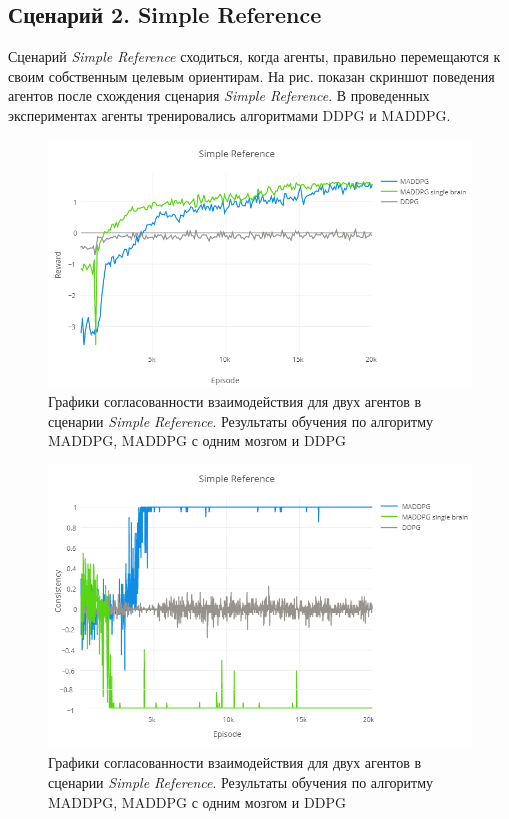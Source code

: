 \subsection{Сценарий 2. Simple Reference}

Сценарий \textit{Simple Reference} сходиться, когда агенты, правильно перемещаются к своим собственным целевым ориентирам. На рис.  показан скриншот поведения агентов после схождения сценария \textit{Simple Reference}. В проведенных экспериментах агенты тренировались алгоритмами DDPG и MADDPG.

\begin{figure}[ht!]
	\center
	\includegraphics [scale=0.6] {my_folder/images/ch5/sr-rew.png}
	\caption{Графики согласованности взаимодействия для двух агентов в сценарии \textit{Simple Reference}. Результаты обучения по алгоритму MADDPG, MADDPG с одним мозгом и DDPG}
	\label{fig:result-sr-rew}
\end{figure}

\begin{figure}[ht!]
	\center
	\includegraphics [scale=0.6] {my_folder/images/ch5/sr-comm.png}
	\caption{Графики согласованности взаимодействия для двух агентов в сценарии \textit{Simple Reference}. Результаты обучения по алгоритму MADDPG, MADDPG с одним мозгом и DDPG}
	\label{fig:result-sr-comm}
\end{figure}

